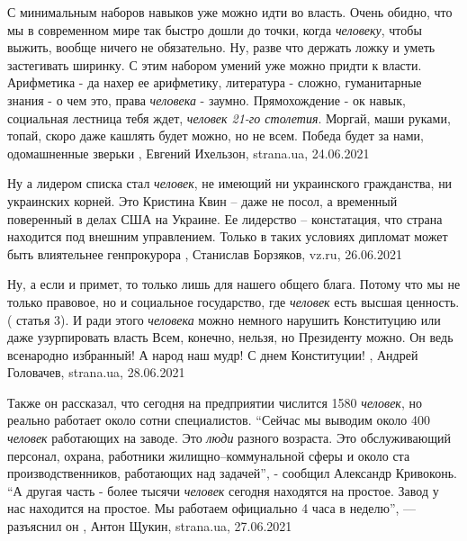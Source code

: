 С минимальным наборов навыков уже можно идти во власть.  Очень обидно, что мы в
современном мире так быстро дошли до точки, когда \emph{человеку}, чтобы выжить,
вообще ничего не обязательно.  Ну, разве что держать ложку и уметь застегивать
ширинку. С этим набором умений уже можно придти к власти.  Арифметика - да
нахер ее арифметику, литература - сложно, гуманитарные знания - о чем это,
права \emph{человека} - заумно.  Прямохождение - ок навык, социальная лестница тебя
ждет, \emph{человек 21-го столетия}. Моргай, маши руками, топай, скоро даже кашлять
будет можно, но не всем. Победа будет за нами, одомашненные зверьки
, 
Евгений Ихельзон, strana.ua, 24.06.2021

Ну а лидером списка стал \emph{человек}, не имеющий ни украинского гражданства, ни
украинских корней. Это Кристина Квин – даже не посол, а временный поверенный в
делах США на Украине. Ее лидерство – констатация, что страна находится под
внешним управлением. Только в таких условиях дипломат может быть влиятельнее
генпрокурора
, 
Станислав Борзяков, vz.ru, 26.06.2021

Ну, а если и примет, то только лишь для нашего общего блага. Потому что мы не
только правовое, но и социальное государство, где \emph{человек} есть высшая
ценность. ( статья 3). И ради этого \emph{человека} можно немного нарушить
Конституцию или даже узурпировать власть Всем, конечно, нельзя, но Президенту
можно. Он ведь всенародно избранный! А народ наш мудр! С днем Конституции!
, 
Андрей Головачев, strana.ua, 28.06.2021

Также он рассказал, что сегодня на предприятии числится 1580 \emph{человек}, но
реально работает около сотни специалистов.  \enquote{Сейчас мы выводим около
400 \emph{человек} работающих на заводе. Это \emph{люди} разного возраста. Это
обслуживающий персонал, охрана, работники жилищно–коммунальной сферы и около
ста производственников, работающих над задачей}, - сообщил Александр Кривоконь.
\enquote{А другая часть - более тысячи \emph{человек} сегодня находятся на
простое.  Завод у нас находится на простое. Мы работаем официально 4 часа в
неделю}, — разъяснил он
, Антон Щукин, strana.ua, 27.06.2021


